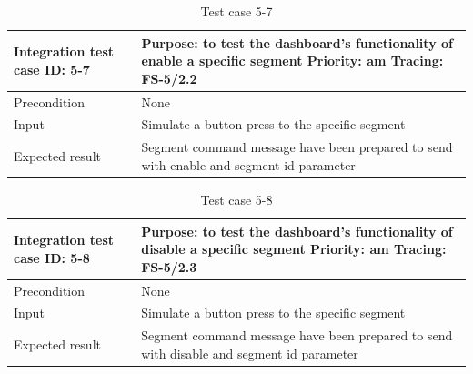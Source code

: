 \begin{table}[H]
	\caption{Test case 5-7}
	\label{table:TCase-FS5-7}
	\begin{center}
		\renewcommand{\arraystretch}{1.8}
		\begin{tabu} 
			to 0.9 \textwidth
			{  X[0.3, l] X[l] }
			\toprule
			Integration test case ID: 5-7 & Purpose: to test the dashboard's functionality of enable a specific segment   \newline Priority: am \newline Tracing: FS-5/2.2 \\ \midrule
			Precondition                  & None                                                                                                                           \\
			Input                         & Simulate a button press to the specific segment                                                                                \\
			Expected result               & Segment command message have been prepared to send with enable and segment id parameter                                        \\ \bottomrule
		\end{tabu}
	\end{center}
\end{table}

\begin{table}[H]
	\caption{Test case 5-8}
	\label{table:TCase-FS5-8}
	\begin{center}
		\renewcommand{\arraystretch}{1.8}
		\begin{tabu} 
			to 0.9 \textwidth
			{  X[0.3, l] X[l] }
			\toprule
			Integration test case ID: 5-8 & Purpose: to test the dashboard's functionality of disable a specific segment   \newline Priority: am \newline Tracing: FS-5/2.3 \\ \midrule
			Precondition                  & None                                                                                                                            \\
			Input                         & Simulate a button press to the specific segment                                                                                 \\
			Expected result               & Segment command message have been prepared to send with disable and segment id parameter                                        \\ \bottomrule
		\end{tabu}
	\end{center}
\end{table}





